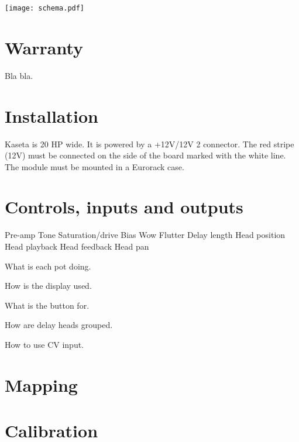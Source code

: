 \documentclass[11pt]{article}
\begin{document}
\begin{minipage}{0.6\textwidth}
\vspace{8mm}

\begin{center}
  \texttt{[image: schema.pdf]}
\end{center}

\end{minipage}

\newpage
\color{black}

\begin{minipage}[t]{0.35\textwidth}

\section {Warranty}

Bla bla.

\section{Installation}

Kaseta is 20 HP wide. It is powered by a +12V/{\textminus}12V 2
connector. The red stripe (\textminus12V) must be connected on the side of the
board marked with the white line. The module must be mounted in a Eurorack case.

\end{minipage}%
\begin{minipage}{0.05\textwidth}
\phantom{ }
\end{minipage}%
\begin{minipage}[t]{0.55\textwidth}

\section{Controls, inputs and outputs}

Pre-amp
Tone
Saturation/drive
Bias
Wow
Flutter
Delay length
Head position
Head playback
Head feedback
Head pan

What is each pot doing.

How is the display used.

What is the button for.

How are delay heads grouped.

How to use CV input.

\section{Mapping}

\section{Calibration}

\end{minipage}
\end{document}
